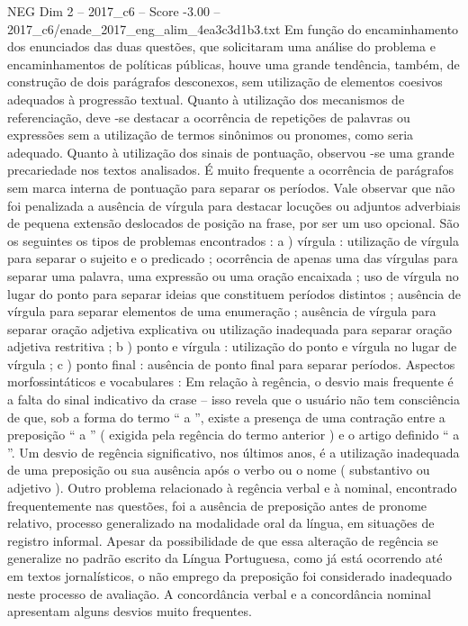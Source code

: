 \begin{textsample}{NEG Dim 2 – 2017\_c6 – Score -3.00 – 2017\_c6/enade\_2017\_eng\_alim\_4ea3c3d1b3.txt}
Em função do encaminhamento dos enunciados das duas questões, que solicitaram uma análise do problema e encaminhamentos de políticas públicas, houve uma grande tendência, também, de construção de dois parágrafos desconexos, sem utilização de elementos coesivos adequados à progressão textual.
Quanto à utilização dos mecanismos de referenciação, deve -se destacar a ocorrência de repetições de palavras ou expressões sem a utilização de termos sinônimos ou pronomes, como seria adequado.
Quanto à utilização dos sinais de pontuação, observou -se uma grande precariedade nos textos analisados.
É muito frequente a ocorrência de parágrafos sem marca interna de pontuação para separar os períodos.
Vale observar que não foi penalizada a ausência de vírgula para destacar locuções ou adjuntos adverbiais de pequena extensão deslocados de posição na frase, por ser um uso opcional.
São os seguintes os tipos de problemas encontrados : a ) vírgula : utilização de vírgula para separar o sujeito e o predicado ; ocorrência de apenas uma das vírgulas para separar uma palavra, uma expressão ou uma oração encaixada ; uso de vírgula no lugar do ponto para separar ideias que constituem períodos distintos ; ausência de vírgula para separar elementos de uma enumeração ; ausência de vírgula para separar oração adjetiva explicativa ou utilização inadequada para separar oração adjetiva restritiva ; b ) ponto e vírgula : utilização do ponto e vírgula no lugar de vírgula ; c ) ponto final : ausência de ponto final para separar períodos.
Aspectos morfossintáticos e vocabulares : Em relação à regência, o desvio mais frequente é a falta do sinal indicativo da crase – isso revela que o usuário não tem consciência de que, sob a forma do termo “ a ”, existe a presença de uma contração entre a preposição “ a ” ( exigida pela regência do termo anterior ) e o artigo definido “ a ”.
Um desvio de regência significativo, nos últimos anos, é a utilização inadequada de uma preposição ou sua ausência após o verbo ou o nome ( substantivo ou adjetivo ).
Outro problema relacionado à regência verbal e à nominal, encontrado frequentemente nas questões, foi a ausência de preposição antes de pronome relativo, processo generalizado na modalidade oral da língua, em situações de registro informal.
Apesar da possibilidade de que essa alteração de regência se generalize no padrão escrito da Língua Portuguesa, como já está ocorrendo até em textos jornalísticos, o não emprego da preposição foi considerado inadequado neste processo de avaliação.
A concordância verbal e a concordância nominal apresentam alguns desvios muito frequentes.

\end{textsample}
